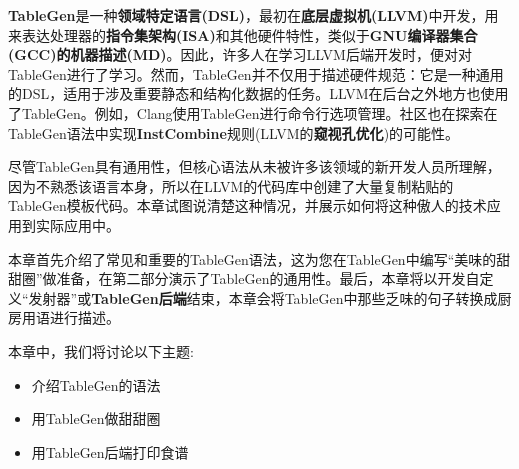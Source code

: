 \textbf{TableGen}是一种\textbf{领域特定语言(DSL)}，最初在\textbf{底层虚拟机(LLVM)}中开发，用来表达处理器的\textbf{指令集架构(ISA)}和其他硬件特性，类似于\textbf{GNU编译器集合(GCC)的机器描述(MD)}。因此，许多人在学习LLVM后端开发时，便对对TableGen进行了学习。然而，TableGen并不仅用于描述硬件规范：它是一种通用的DSL，适用于涉及重要静态和结构化数据的任务。LLVM在后台之外地方也使用了TableGen。例如，Clang使用TableGen进行命令行选项管理。社区也在探索在TableGen语法中实现\textbf{InstCombine}规则(LLVM的\textbf{窥视孔优化})的可能性。

尽管TableGen具有通用性，但核心语法从未被许多该领域的新开发人员所理解，因为不熟悉该语言本身，所以在LLVM的代码库中创建了大量复制粘贴的TableGen模板代码。本章试图说清楚这种情况，并展示如何将这种傲人的技术应用到实际应用中。

本章首先介绍了常见和重要的TableGen语法，这为您在TableGen中编写“美味的甜甜圈”做准备，在第二部分演示了TableGen的通用性。最后，本章将以开发自定义“发射器”或\textbf{TableGen后端}结束，本章会将TableGen中那些乏味的句子转换成厨房用语进行描述。

本章中，我们将讨论以下主题:

\begin{itemize}
\item 介绍TableGen的语法
\item 用TableGen做甜甜圈
\item 用TableGen后端打印食谱
\end{itemize}















